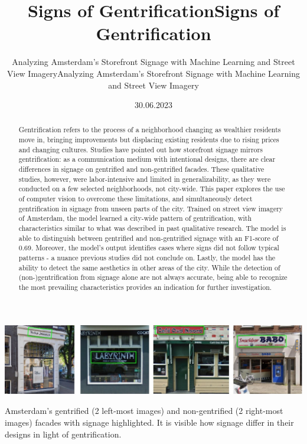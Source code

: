 \documentclass[ds, nofrontpicture, nofirstcompanypicture, nosecondcompanypicture]{mscthesis}
\title{Signs of Gentrification}
\subtitle{Analyzing Amsterdam's Storefront Signage with Machine Learning and Street View Imagery}
\date{30.06.2023}
\begin{document}
\pagestyle{plain}
\setcounter{page}{1}

\maketitlepage
\fixemptypage

\title{Signs of Gentrification}
\subtitle{Analyzing Amsterdam's Storefront Signage with Machine Learning and Street View Imagery}

\begin{abstract}
Gentrification refers to the process of a neighborhood changing as wealthier residents move in, bringing improvements but displacing existing residents due to rising prices and changing cultures. Studies have pointed out how storefront signage mirrors gentrification: as a communication medium with intentional designs, there are clear differences in signage on gentrified and non-gentrified facades. These qualitative studies, however, were labor-intensive and limited in generalizability, as they were conducted on a few selected neighborhoods, not city-wide. This paper explores the use of computer vision to overcome these limitations, and simultaneously detect gentrification in signage from unseen parts of the city. Trained on street view imagery of Amsterdam, the model learned a city-wide pattern of gentrification, with characteristics similar to what was described in past qualitative research. The model is able to distinguish between gentrified and non-gentrified signage with an F1-score of 0.69. Moreover, the model's output identifies cases where signs did not follow typical patterns - a nuance previous studies did not conclude on. Lastly, the model has the ability to detect the same aesthetics in other areas of the city. While the detection of (non-)gentrification from signage alone are not always accurate, being able to recognize the most prevailing characteristics provides an indication for further investigation.
\end{abstract}

\begin{teaserfigure}
    \centering
    \includegraphics[width=\textwidth]{media/titlepage/frontman.jpg}
    \caption{Amsterdam's gentrified (2 left-most images) and non-gentrified (2 right-most images) facades with signage highlighted. It is visible how signage differ in their designs in light of gentrification.}
\end{teaserfigure}
\end{document}
